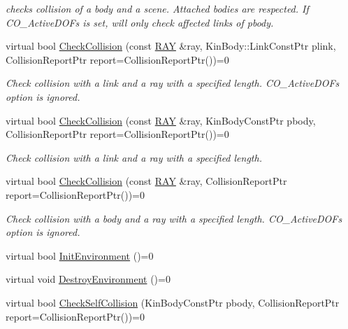 \begin{DoxyCompactItemize}
\begin{DoxyCompactList}\small\item\em checks collision of a body and a scene. Attached bodies are respected. If CO\_\-ActiveDOFs is set, will only check affected links of pbody. \item\end{DoxyCompactList}\item 
virtual bool \hyperlink{classOpenRAVE_1_1CollisionCheckerBase_a0031940d50e5853bed26dd8f37eeb9d6}{CheckCollision} (const \hyperlink{classOpenRAVE_1_1geometry_1_1ray}{RAY} \&ray, KinBody::LinkConstPtr plink, CollisionReportPtr report=CollisionReportPtr())=0
\begin{DoxyCompactList}\small\item\em Check collision with a link and a ray with a specified length. CO\_\-ActiveDOFs option is ignored. \item\end{DoxyCompactList}\item 
virtual bool \hyperlink{classOpenRAVE_1_1CollisionCheckerBase_a91d971fb7be4e4b653fd02ee9bd6528c}{CheckCollision} (const \hyperlink{classOpenRAVE_1_1geometry_1_1ray}{RAY} \&ray, KinBodyConstPtr pbody, CollisionReportPtr report=CollisionReportPtr())=0
\begin{DoxyCompactList}\small\item\em Check collision with a link and a ray with a specified length. \item\end{DoxyCompactList}\item 
virtual bool \hyperlink{classOpenRAVE_1_1CollisionCheckerBase_a4c0906fc2d591ac8940c55ad5a16969f}{CheckCollision} (const \hyperlink{classOpenRAVE_1_1geometry_1_1ray}{RAY} \&ray, CollisionReportPtr report=CollisionReportPtr())=0
\begin{DoxyCompactList}\small\item\em Check collision with a body and a ray with a specified length. CO\_\-ActiveDOFs option is ignored. \item\end{DoxyCompactList}\item 
virtual bool \hyperlink{classOpenRAVE_1_1CollisionCheckerBase_a253ffd76b6c58523ff7813a7e777cce0}{InitEnvironment} ()=0
\item 
virtual void \hyperlink{classOpenRAVE_1_1CollisionCheckerBase_addd261b357621ad88f262f311792efb6}{DestroyEnvironment} ()=0
\item 
virtual bool \hyperlink{classOpenRAVE_1_1CollisionCheckerBase_a5e1f41d8d334da4d500a4cc107bfb696}{CheckSelfCollision} (KinBodyConstPtr pbody, CollisionReportPtr report=CollisionReportPtr())=0

\end{DoxyCompactItemize}
